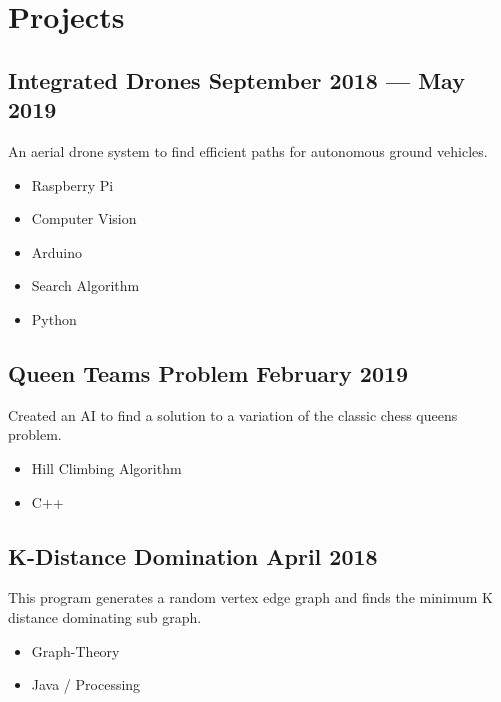 \section{Projects}
\subsection{Integrated Drones \hfill September 2018 --- May 2019}
An aerial drone system to find efficient paths for autonomous ground vehicles.
\begin{multicols}{2}
	\begin{itemize}
		\item Raspberry Pi
		\item Computer Vision
		\item Arduino
		\item Search Algorithm
		\item Python
	\end{itemize}
\end{multicols}
\subsection{Queen Teams Problem \hfill February 2019}
Created an AI to find a solution to a variation of the classic chess queens problem.
\begin{multicols}{2}
	\begin{itemize}
		\item Hill Climbing Algorithm
		\item C++
	\end{itemize}
\end{multicols}
\subsection{K-Distance Domination \hfill April 2018}
\justify
This program generates a random vertex edge graph and finds the minimum K distance dominating sub graph.
\begin{multicols}{2}
	\begin{itemize}
		\item Graph-Theory
		\item Java / Processing
	\end{itemize}
\end{multicols}

